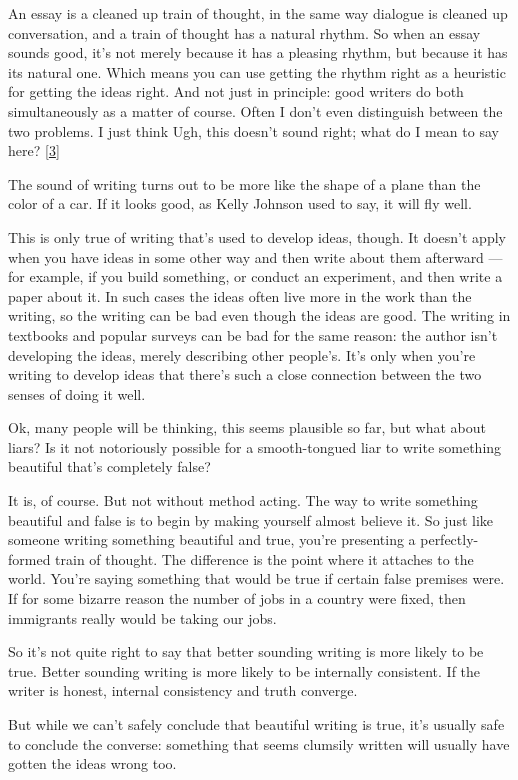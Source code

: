An essay is a cleaned up train of thought, in the same way dialogue is
cleaned up conversation, and a train of thought has a natural rhythm. So
when an essay sounds good, it's not merely because it has a pleasing
rhythm, but because it has its natural one. Which means you can use
getting the rhythm right as a heuristic for getting the ideas right. And
not just in principle: good writers do both simultaneously as a matter
of course. Often I don't even distinguish between the two problems. I
just think Ugh, this doesn't sound right; what do I mean to say here?
{[}\hyperref[f3n]{3}{]}

The sound of writing turns out to be more like the shape of a plane than
the color of a car. If it looks good, as Kelly Johnson used to say, it
will fly well.

This is only true of writing that's used to develop ideas, though. It
doesn't apply when you have ideas in some other way and then write about
them afterward --- for example, if you build something, or conduct an
experiment, and then write a paper about it. In such cases the ideas
often live more in the work than the writing, so the writing can be bad
even though the ideas are good. The writing in textbooks and popular
surveys can be bad for the same reason: the author isn't developing the
ideas, merely describing other people's. It's only when you're writing
to develop ideas that there's such a close connection between the two
senses of doing it well.

Ok, many people will be thinking, this seems plausible so far, but what
about liars? Is it not notoriously possible for a smooth-tongued liar to
write something beautiful that's completely false?

It is, of course. But not without method acting. The way to write
something beautiful and false is to begin by making yourself almost
believe it. So just like someone writing something beautiful and true,
you're presenting a perfectly-formed train of thought. The difference is
the point where it attaches to the world. You're saying something that
would be true if certain false premises were. If for some bizarre reason
the number of jobs in a country were fixed, then immigrants really would
be taking our jobs.

So it's not quite right to say that better sounding writing is more
likely to be true. Better sounding writing is more likely to be
internally consistent. If the writer is honest, internal consistency and
truth converge.

But while we can't safely conclude that beautiful writing is true, it's
usually safe to conclude the converse: something that seems clumsily
written will usually have gotten the ideas wrong too.

